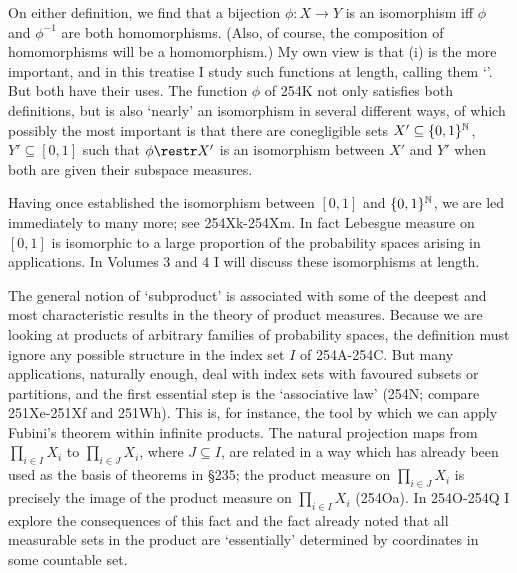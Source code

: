 {


\noindent On either definition, we find that a bijection $\phi:X\to Y$
is an isomorphism iff $\phi$ and $\phi^{-1}$ are both homomorphisms.
(Also, of course, the composition of homomorphisms will be a
homomorphism.)   My own view is that (i) is the more important, and
in this treatise I study such functions at length, calling
them `\imp'.   But both have their uses.   The
function $\phi$ of 254K not only satisfies both definitions, but is also
`nearly' an isomorphism in several different ways, of which possibly
the most important is that there are conegligible sets
$X'\subseteq\{0,1\}^{\Bbb N}$,
$Y'\subseteq [0,1]$ such that $\phi\restr X'$ is an
isomorphism between $X'$ and $Y'$ when both are
given their subspace measures.

Having once established the isomorphism between $[0,1]$ and
$\{0,1\}^{\Bbb N}$, we are led immediately to many more;  see
254Xk-254Xm.   In fact Lebesgue measure on $[0,1]$ is isomorphic to a
large proportion of the probability spaces arising in applications.   In
Volumes 3 and 4 I will discuss these isomorphisms at length.

The general notion of `subproduct' is associated with some of the
deepest and most characteristic results in the theory of product
measures.   Because we are looking at products of arbitrary families of
probability spaces, the definition must ignore any possible structure in
the index set $I$ of 254A-254C.   But many applications, naturally
enough, deal with index sets with favoured subsets or partitions, and
the first essential step is the `associative law' (254N;  compare
251Xe-251Xf and 251Wh).   This is, for instance, the tool by which
we can apply Fubini's theorem within infinite products.   The natural
projection maps from $\prod_{i\in I}X_i$ to $\prod_{i\in J}X_i$, where
$J\subseteq I$, are related in a way which has already been used as the
basis of theorems in \S235;  the product measure on $\prod_{i\in J}X_i$
is precisely the image of the product measure on $\prod_{i\in I}X_i$
(254Oa).   In 254O-254Q I explore the consequences of this fact and the
fact already noted that all measurable sets in the product are
`essentially' determined by coordinates in some countable set.

}
